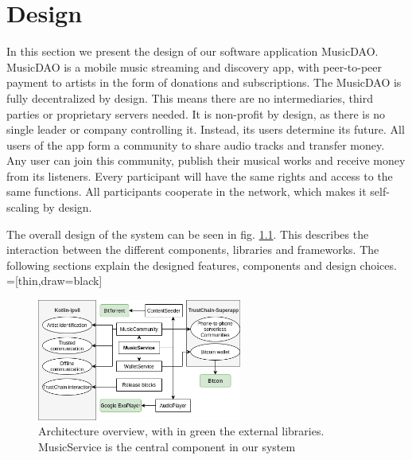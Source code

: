 \chapter{Design}
In this section we present the design of our software application MusicDAO. MusicDAO is a mobile music streaming and discovery app, with peer-to-peer payment to artists in the form of donations and subscriptions. The MusicDAO is fully decentralized by design. This means there are no intermediaries, third parties or proprietary servers needed. It is non-profit by design, as there is no single leader or company controlling it. Instead, its users determine its future. All users of the app form a community to share audio tracks and transfer money. Any user can join this community, publish their musical works and receive money from its listeners. Every participant will have the same rights and access to the same functions. All participants cooperate in the network, which makes it self-scaling by design.

The overall design of the system can be seen in fig. \ref{fig:architecture}. This describes the interaction between the different components, libraries and frameworks. The following sections explain the designed features, components and design choices.
\\

=[thin,draw=black]

\begin{figure}
    \includegraphics[width=0.6\textwidth]{design/architecture-v1.png}
    \caption{Architecture overview, with in green the external libraries. MusicService is the central component in our system}
    \label{fig:architecture}
\end{figure}

